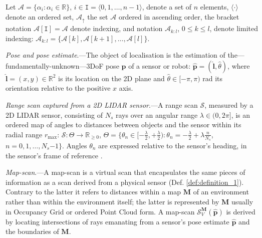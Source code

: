 Let $\mathcal{A} = \{\alpha_i: \alpha_i \in \mathbb{R}\}$,
$i \in \texttt{I} = \langle 0,1,\dots,n-1 \rangle$, denote a set of $n$ elements,
$\langle\cdot\rangle$ denote an ordered set, $\mathcal{A}_{\uparrow}$ the
set $\mathcal{A}$ ordered in ascending order, the bracket notation
$\mathcal{A}[\texttt{I}] = \mathcal{A}$ denote indexing, and notation
$\mathcal{A}_{k:l}$, $0 \leq k \leq l$, denote limited indexing:
$\mathcal{A}_{k:l}= \{\mathcal{A}[k], \mathcal{A}[k+1], \dots, \mathcal{A}[l]\}$.

\begin{definition}
  \label{def:definition_0} \textit{Pose and pose estimate}.---The object of
  localisation is the estimation of the---fundamentally-unknown---3DoF pose
  $\bm{p}$ of a sensor or robot: $\hat{\bm{p}} = (\hat{\bm{l}}, \hat{\theta})$,
  where $\hat{\bm{l}} = (x,y) \in \mathbb{R}^2$ is its location on the 2D plane
  and $\hat{\theta} \in [-\pi, \pi)$ rad its orientation relative to the
  positive $x$ axis.
\end{definition}

\begin{definition}
  \label{def:definition_1} \textit{Range scan captured from a 2D LIDAR
  sensor}.---A range scan $\mathcal{S}$, measured by a 2D LIDAR sensor,
  consisting of $N_s$ rays over an angular range $\lambda \in (0,2\pi]$, is an
  ordered map of angles to distances between objects and the sensor within its
  radial range $r_{\max}$: $\mathcal{S} : \Theta \rightarrow \mathbb{R}_{\geq
  0}$, $\Theta = \{\theta_n \in [-\frac{\lambda}{2}, +\frac{\lambda}{2}) :
  \theta_n = -\frac{\lambda}{2} + \lambda \frac{n}{N_s}$, $n = 0,1,\dots,
  N_s$$-$$1$$\}$.  Angles $\theta_n$ are expressed relative to the sensor's
  heading, in the sensor's frame of reference \cite{Cooper2018c}.
\end{definition}

\begin{definition}
  \label{def:definition_2} \textit{Map-scan}.---A map-scan is a virtual scan
  that encapsulates the same pieces of information as a scan derived from a
  physical sensor (Def. \ref{def:definition_1}). Contrary to the latter it
  refers to distances within a map $\bm{M}$ of an environment rather than within
  the environment itself; the latter is represented by $\bm{M}$ usually in
  Occupancy Grid or ordered Point Cloud form. A map-scan
  $\mathcal{S}_V^{\bm{M}}(\hat{\bm{p}})$ is derived by locating intersections
  of rays emanating from a sensor's pose estimate $\hat{\bm{p}}$ and the
  boundaries of $\bm{M}$.
\end{definition}


